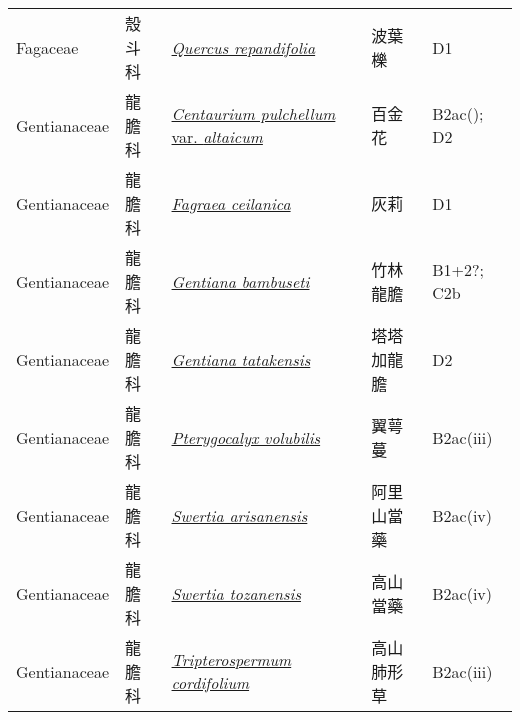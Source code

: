 {\begin{longtable}{L{2.5cm}L{2cm}L{5cm}L{2.5cm}L{3cm}}
    Fagaceae & 殼斗科 & \href{http://www.theplantlist.org/tpl1.1/search?q=Quercus+repandifolia}{\textit{Quercus repandifolia} } & 波葉櫟 & D1    \\
    Gentianaceae & 龍膽科 & \href{http://www.theplantlist.org/tpl1.1/search?q=Centaurium+pulchellum+var.+altaicum}{\textit{Centaurium pulchellum} var. \textit{altaicum} } & 百金花 & B2ac(); D2    \\
    Gentianaceae & 龍膽科 & \href{http://www.theplantlist.org/tpl1.1/search?q=Fagraea+ceilanica}{\textit{Fagraea ceilanica} } & 灰莉 & D1    \\
    Gentianaceae & 龍膽科 & \href{http://www.theplantlist.org/tpl1.1/search?q=Gentiana+bambuseti}{\textit{Gentiana bambuseti} } & 竹林龍膽 & B1+2?; C2b    \\
    Gentianaceae & 龍膽科 & \href{http://www.theplantlist.org/tpl1.1/search?q=Gentiana+tatakensis}{\textit{Gentiana tatakensis} } & 塔塔加龍膽 & D2    \\
    Gentianaceae & 龍膽科 & \href{http://www.theplantlist.org/tpl1.1/search?q=Pterygocalyx+volubilis}{\textit{Pterygocalyx volubilis} } & 翼萼蔓 & B2ac(iii)    \\
    Gentianaceae & 龍膽科 & \href{http://www.theplantlist.org/tpl1.1/search?q=Swertia+arisanensis}{\textit{Swertia arisanensis} } & 阿里山當藥 & B2ac(iv)    \\
    Gentianaceae & 龍膽科 & \href{http://www.theplantlist.org/tpl1.1/search?q=Swertia+tozanensis}{\textit{Swertia tozanensis} } & 高山當藥 & B2ac(iv)    \\
    Gentianaceae & 龍膽科 & \href{http://www.theplantlist.org/tpl1.1/search?q=Tripterospermum+cordifolium}{\textit{Tripterospermum cordifolium} } & 高山肺形草 & B2ac(iii)    \\

\end{longtable}}

